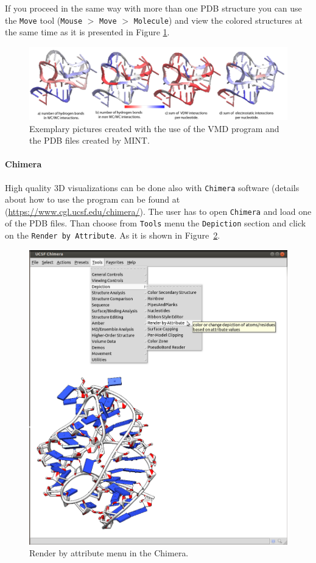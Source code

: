\documentclass[12pt]{article}
\begin{document}
If you proceed in the same way with more than one PDB structure you can use the \texttt{Move} tool (\texttt{Mouse} $>$ \texttt{Move} $>$ \texttt{Molecule}) and view the colored structures at the same time as it is presented in Figure \ref{3Ddifferent}.

\begin{figure}[h!]
\centering
\includegraphics[scale=0.65]{./pictures/3D_different.png}
\caption{Exemplary pictures created with the use of the VMD program and the PDB files created by MINT.}
\label{3Ddifferent}
\end{figure}

\paragraph{Chimera}
High quality 3D visualizations can be done also with {\tt Chimera} software (details about how to use the program can be found at (\url{https://www.cgl.ucsf.edu/chimera/}). The user has to open {\tt Chimera} and load one of the PDB files. Than choose from \texttt{Tools} menu the \texttt{Depiction} section and click on the \texttt{Render by Attribute}. As it is shown in Figure~\ref{chimera1}.

\begin{figure}[h!]
\centering
\includegraphics[scale=0.3]{./pictures/chimera1.png}
\caption{Render by attribute menu in the Chimera.}
\label{chimera1}
\end{figure}
\end{document}
